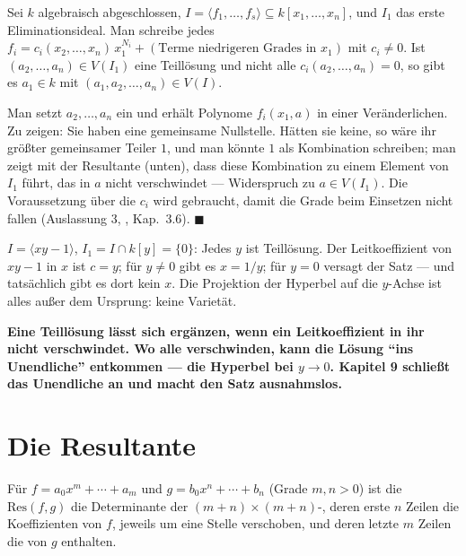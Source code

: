 \begin{merksatz}
Sei $k$ algebraisch abgeschlossen, $I = \langle f_1, \ldots, f_s\rangle\subseteq k[x_1, \ldots, x_n]$, und $I_1$ das erste Eliminationsideal. Man schreibe jedes $f_i = c_i(x_2, \ldots, x_n)\,x_1^{N_i} + (\text{Terme niedrigeren Grades in } x_1)$ mit $c_i\ne0$. Ist $(a_2, \ldots, a_n)\in V(I_1)$ eine Teillösung und nicht alle $c_i(a_2, \ldots, a_n) = 0$, so gibt es $a_1\in k$ mit $(a_1, a_2, \ldots, a_n)\in V(I)$.

Man setzt $a_2, \ldots, a_n$ ein und erhält Polynome $f_i(x_1, a)$ in einer Veränderlichen. Zu zeigen: Sie haben eine gemeinsame Nullstelle. Hätten sie keine, so wäre ihr größter gemeinsamer Teiler $1$, und man könnte $1$ als Kombination schreiben; man zeigt mit der Resultante (unten), dass diese Kombination zu einem Element von $I_1$ führt, das in $a$ nicht verschwindet --- Widerspruch zu $a\in V(I_1)$. Die Voraussetzung über die $c_i$ wird gebraucht, damit die Grade beim Einsetzen nicht fallen (Auslassung 3, , Kap.~3.6). $\blacksquare$

$I = \langle xy - 1\rangle$, $I_1 = I\cap k[y] = \{0\}$: Jedes $y$ ist Teillösung. Der Leitkoeffizient von $xy - 1$ in $x$ ist $c = y$; für $y\ne0$ gibt es $x = 1/y$; für $y = 0$ versagt der Satz --- und tatsächlich gibt es dort kein $x$. Die Projektion der Hyperbel auf die $y$-Achse ist alles außer dem Ursprung: keine Varietät.

\begin{center}
\begin{minipage}{0.9\textwidth}
\textbf{Eine Teillösung lässt sich ergänzen, wenn ein Leitkoeffizient in ihr nicht verschwindet. Wo alle verschwinden, kann die Lösung \enquote{ins Unendliche} entkommen --- die Hyperbel bei $y\to0$. Kapitel 9 schließt das Unendliche an und macht den Satz ausnahmslos.}
\end{minipage}
\end{center}
\end{merksatz}

\section{Die Resultante}

\begin{definition}
Für $f = a_0x^{m} + \cdots + a_m$ und $g = b_0x^{n} + \cdots + b_n$ (Grade $m, n > 0$) ist die  $\mathrm{Res}(f, g)$ die Determinante der $(m + n)\times(m + n)$-, deren erste $n$ Zeilen die Koeffizienten von $f$, jeweils um eine Stelle verschoben, und deren letzte $m$ Zeilen die von $g$ enthalten.
\end{definition}

